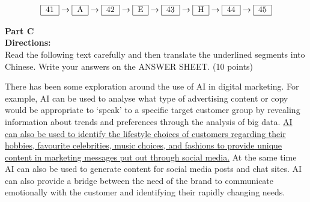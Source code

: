\[ 
\begin{tabular}{|c|}
	\hline
	41 \\
	\hline
\end{tabular}
\rightarrow
\begin{tabular}{|c|}
	\hline
	A \\
	\hline
\end{tabular}
\rightarrow
\begin{tabular}{|c|}
	\hline
	42 \\
	\hline
\end{tabular}
\rightarrow
\begin{tabular}{|c|}
	\hline
	E \\
	\hline
\end{tabular}
\rightarrow
\begin{tabular}{|c|}
	\hline
	43 \\
	\hline
\end{tabular}
\rightarrow
\begin{tabular}{|c|}
	\hline
	H \\
	\hline
\end{tabular}
\rightarrow
\begin{tabular}{|c|}
	\hline
	44 \\
	\hline
\end{tabular}
\rightarrow
\begin{tabular}{|c|}
	\hline
	45 \\
	\hline
\end{tabular}
\]

\phantom{ \linefill \linefill \linefill \linefill \linefill}

\newpage
\noindent
\textbf{Part C}\\
\textbf{Directions:}\\
Read the following text carefully and then translate the underlined segments into Chinese. Write your answers on the ANSWER SHEET. (10 points)

\TiGanSpace

There has been some exploration around the use of AI in digital marketing. For example, AI can be used to analyse what type of advertising content or copy would be appropriate to ‘speak’ to a specific target customer group by revealing information about trends and preferences through the analysis of big data. \transnum  \uline{ AI can also be used to identify the lifestyle choices of customers regarding their hobbies, favourite celebrities, music choices, and fashions to provide unique content in marketing messages put out through social media.} At the same time AI can also be used to generate content for social media posts and chat sites. AI can also provide a bridge between the need of the brand to communicate emotionally with the customer and identifying their rapidly changing needs.

